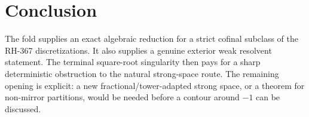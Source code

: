 \documentclass[11pt]{article}
\begin{document}
\section{Conclusion}

The fold supplies an exact algebraic reduction for a strict cofinal subclass
of the RH-367 discretizations.  It also supplies a genuine exterior weak
resolvent statement.  The terminal square-root singularity then pays for a
sharp deterministic obstruction to the natural strong-space route.  The
remaining opening is explicit: a new fractional/tower-adapted strong space,
or a theorem for non-mirror partitions, would be needed before a contour
around $-1$ can be discussed.



\end{document}
